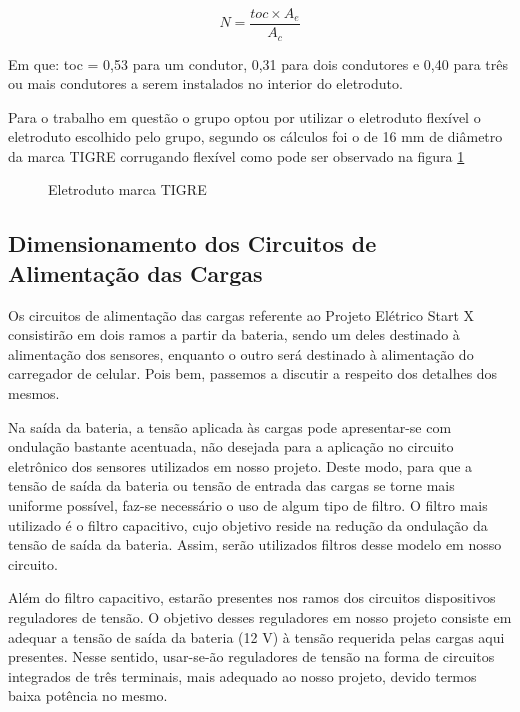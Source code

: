 \begin{equation}
	N = \frac{toc \times A_e}{A_c}
\end{equation}

Em que: toc = 0,53 para um condutor, 0,31 para dois condutores e 0,40 para três ou mais condutores a serem instalados no interior do eletroduto.

Para o trabalho em questão o grupo optou por utilizar o eletroduto flexível o eletroduto escolhido pelo grupo, segundo os cálculos foi o de 16 mm de diâmetro da marca TIGRE corrugando flexível como pode ser observado na figura \ref{eletroduto-tigre}

\begin{figure}[h]
	\centering
	\caption{Eletroduto marca TIGRE}
	\label{eletroduto-tigre}
\end{figure}

\subsection{Dimensionamento dos Circuitos de Alimentação das Cargas}

Os circuitos de alimentação das cargas referente ao Projeto Elétrico Start X consistirão em dois ramos a partir da bateria, sendo um deles destinado à alimentação dos sensores, enquanto o outro será destinado à alimentação do carregador de celular. Pois bem, passemos a discutir a respeito dos detalhes dos mesmos.

Na saída da bateria, a tensão aplicada às cargas pode apresentar-se com ondulação bastante acentuada, não desejada para a aplicação no circuito eletrônico dos sensores utilizados em nosso projeto. Deste modo, para que a tensão de saída da bateria ou tensão de entrada das cargas se torne mais uniforme possível, faz-se necessário o uso de algum tipo de filtro. O filtro mais utilizado é o filtro capacitivo, cujo objetivo reside na redução da ondulação da tensão de saída da bateria. Assim, serão utilizados filtros desse modelo em nosso circuito.

Além do filtro capacitivo, estarão presentes nos ramos dos circuitos dispositivos reguladores de tensão. O objetivo desses reguladores em nosso projeto consiste em adequar a tensão de saída da bateria (12 V) à tensão requerida pelas cargas aqui presentes. Nesse sentido, usar-se-ão reguladores de tensão na forma de circuitos integrados de três terminais, mais adequado ao nosso projeto, devido termos baixa potência no mesmo.

